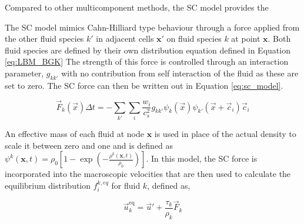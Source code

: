 
Compared to other multicomponent methods, the SC model provides the 

The SC model mimics Cahn-Hilliard type behaviour through a force applied from the other fluid species $k'$ in adjacent 
cells $\mathbf{x'}$ on fluid species $k$ at point $\mathbf{x}$. \cite{shan_lattice_1993, shan_simulation_1994, 
shan_multicomponent_1995, he_discrete_1998, jansen_bijels_2011, chin_lattice_2002} Both fluid species are defined
by their own distribution equation defined in Equation \ref{eq:LBM_BGK} The strength of this force is controlled 
through an interaction parameter, $g_{kk'}$ with no contribution from self interaction of the fluid as these are 
set to zero. The SC force can then be written out in Equation \ref{eq:sc_model}.

\begin{equation}
\vec{F}_k(\vec{x}) \Delta t = - \sum_{k'} \sum_i \frac{w_i}{c_s^2} g_{kk'} \psi_k(\vec{x})\psi_{k'}(\vec{x}+\vec{c}_i) \vec{c}_i
\label{eq:sc_model}
\end{equation}

An effective mass of each fluid at node $\mathbf{x}$ is used in place of the actual density to scale it between zero 
and one and is defined as $\psi^{k}(\mathbf{x},t) = \rho_{0}\left[1 - \exp(-\frac{\rho^{k}(\mathbf{x}, t)}{\rho_{0}})\right]$. 
In this model, the SC force is incorporated into the macroscopic velocities that are then used to calculate the equilibrium
distribution $f_{i}^{k, eq}$ for fluid $k$, defined as,

\begin{equation}
\vec{u}_k^{\text{eq}} = \vec{u}' + \frac{\tau_k}{\rho_k} \vec{F}_k
\end{equation}

